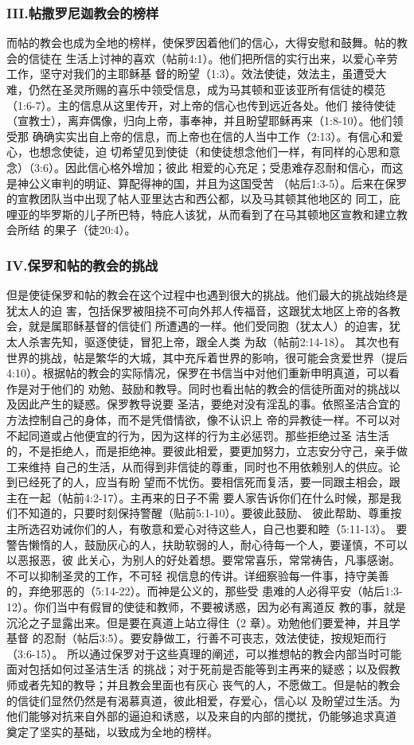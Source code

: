 \subsubsection{III.帖撒罗尼迦教会的榜样}
而帖的教会也成为全地的榜样，使保罗因着他们的信心，大得安慰和鼓舞。帖的教会的信徒在
生活上讨神的喜欢（帖前4:1）。他们把所信的实行出来，以爱心辛劳工作，坚守对我们的主耶稣基
督的盼望（1:3）。效法使徒，效法主，虽遭受大难，仍然在圣灵所赐的喜乐中领受信息，成为马其顿和亚该亚所有信徒的模范（1:6-7）。主的信息从这里传开，对上帝的信心也传到远近各处。他们
接待使徒（宣教士），离弃偶像，归向上帝，事奉神，并且盼望耶稣再来（1:8-10）。他们领受那
确确实实出自上帝的信息，而上帝也在信的人当中工作（2:13）。有信心和爱心，也想念使徒，迫
切希望见到使徒（和使徒想念他们一样，有同样的心思和意念）（3:6）。因此信心格外增加；彼此
相爱的心充足；受患难存忍耐和信心，而这是神公义审判的明证、算配得神的国，并且为这国受苦
（帖后1:3-5）。后来在保罗的宣教团队当中出现了帖人亚里达古和西公都，以及马其顿其他地区的
同工，庇哩亚的毕罗斯的儿子所巴特，特庇人该犹，从而看到了在马其顿地区宣教和建立教会所结
的果子（徒20:4）。

\subsubsection{IV.保罗和帖的教会的挑战}
但是使徒保罗和帖的教会在这个过程中也遇到很大的挑战。他们最大的挑战始终是犹太人的迫
害，包括保罗被阻挠不可向外邦人传福音，这跟犹太地区上帝的各教会，就是属耶稣基督的信徒们
所遭遇的一样。他们受同胞（犹太人）的迫害，犹太人杀害先知，驱逐使徒，冒犯上帝，跟全人类
为敌（帖前2:14-18）。
其次也有世界的挑战，帖是繁华的大城，其中充斥着世界的影响，很可能会贪爱世界（提后
4:10）。根据帖的教会的实际情况，保罗在书信当中对他们重新申明真道，可以看作是对于他们的
劝勉、鼓励和教导。同时也看出帖的教会的信徒所面对的挑战以及因此产生的疑惑。保罗教导说要
圣洁，要绝对没有淫乱的事。依照圣洁合宜的方法控制自己的身体，而不是凭借情欲，像不认识上
帝的异教徒一样。不可以对不起同道或占他便宜的行为，因为这样的行为主必惩罚。那些拒绝过圣
洁生活的，不是拒绝人，而是拒绝神。要彼此相爱，要更加努力，立志安分守己，亲手做工来维持
自己的生活，从而得到非信徒的尊重，同时也不用依赖别人的供应。论到已经死了的人，应当有盼
望而不忧伤。要相信死而复活，要一同跟主相会，跟主在一起（帖前4:2-17）。主再来的日子不需
要人家告诉你们在什么时候，那是我们不知道的，只要时刻保持警醒（贴前5:1-10）。要彼此鼓励、
彼此帮助、尊重按主所选召劝诫你们的人，有敬意和爱心对待这些人，自己也要和睦（5:11-13）。
要警告懒惰的人，鼓励灰心的人，扶助软弱的人，耐心待每一个人，要谨慎，不可以以恶报恶，彼
此关心，为别人的好处着想。要常常喜乐，常常祷告，凡事感谢。不可以抑制圣灵的工作，不可轻
视信息的传讲。详细察验每一件事，持守美善的，弃绝邪恶的（5:14-22）。而神是公义的，那些受
患难的人必得平安（帖后1:3-12）。你们当中有假冒的使徒和教师，不要被诱惑，因为必有离道反
教的事，就是沉沦之子显露出来。但是要在真道上站立得住（2 章）。劝勉他们要爱神，并且学基督
的忍耐（帖后3:5）。要安静做工，行善不可丧志，效法使徒，按规矩而行（3:6-15）。
所以通过保罗对于这些真理的阐述，可以推想帖的教会内部当时可能面对包括如何过圣洁生活
的挑战；对于死前是否能等到主再来的疑惑；以及假教师或者先知的教导；并且教会里面也有灰心
丧气的人，不愿做工。但是帖的教会的信徒们显然仍然是有渴慕真道，彼此相爱，存爱心，信心以
及盼望过生活。为他们能够对抗来自外部的逼迫和诱惑，以及来自的内部的搅扰，仍能够追求真道
奠定了坚实的基础，以致成为全地的榜样。
